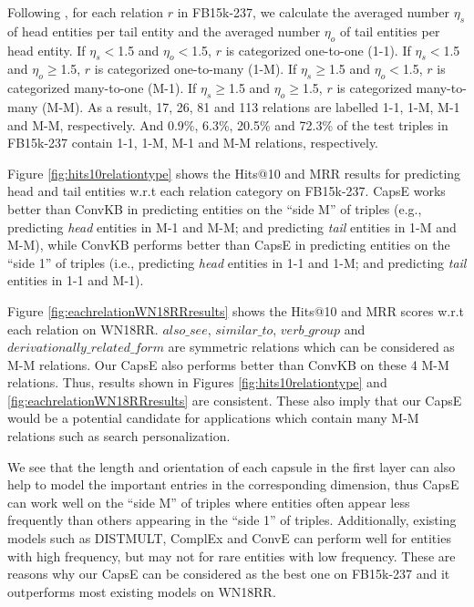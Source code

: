 \documentclass[11pt,a4paper]{article}
\begin{document}
Following \citet{NIPS2013_5071}, for each relation $r$ in FB15k-237, we calculate the averaged number $\eta_s$ of head entities per tail entity and the averaged number $\eta_o$ of tail entities per head entity. 
If $\eta_s < $1.5 and $\eta_o < $1.5, $r$ is categorized  one-to-one  (1-1).
If $\eta_s < $1.5 and $\eta_o \geq $1.5, $r$ is categorized  one-to-many (1-M).
If $\eta_s \geq $1.5 and $\eta_o < $1.5, $r$ is categorized  many-to-one (M-1).
If $\eta_s \geq $1.5 and $\eta_o \geq $1.5, $r$ is categorized  many-to-many (M-M). 
As a result, 17, 26, 81 and 113 relations are labelled  1-1, 1-M, M-1 and M-M, respectively. 
And 0.9\%, 6.3\%, 20.5\% and 72.3\% of the test triples in FB15k-237 contain 1-1, 1-M, M-1 and M-M relations, respectively.

Figure \ref{fig:hits10relationtype} shows the Hits@10 and MRR results for predicting head and tail entities w.r.t each relation category on FB15k-237.
CapsE works better than ConvKB in predicting entities on the ``side M'' of triples (e.g., predicting \textit{head} entities in M-1 and M-M; and predicting \textit{tail} entities in 1-M and M-M), while ConvKB performs better than CapsE in predicting entities on the ``side 1'' of triples (i.e., predicting \textit{head} entities in 1-1 and 1-M; and predicting \textit{tail} entities in 1-1 and M-1).



Figure \ref{fig:eachrelationWN18RRresults} shows the Hits@10 and MRR scores w.r.t each relation on WN18RR.
$also\_see$, $similar\_to$, $verb\_group$ and $derivationally\_related\_form$ are symmetric relations which can be considered as M-M relations.
Our CapsE also performs better than ConvKB on these 4 M-M relations.
Thus, results shown in Figures \ref{fig:hits10relationtype} and  \ref{fig:eachrelationWN18RRresults} are consistent.
These also imply that our CapsE would be a potential candidate for applications which contain many M-M relations such as search personalization. 

We see that the length and orientation of each capsule in the first layer can also help to model the important entries in the corresponding dimension, thus CapsE can work well on the ``side M'' of triples where entities often appear less frequently than others appearing in the ``side 1'' of triples.
Additionally, existing models such as DISTMULT, ComplEx and ConvE can perform well for entities with high frequency, but may not for rare entities with low frequency.
These are reasons why our CapsE can be considered as the best one on FB15k-237 and it outperforms most existing models on WN18RR.
\end{document}
